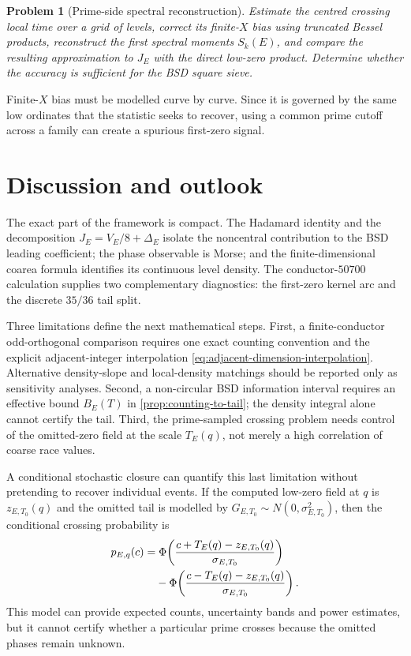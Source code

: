 \documentclass[11pt,reqno]{amsart}
\newtheorem{problem}{Problem}
\theoremstyle{remark}
\begin{document}
\begin{problem}[Prime-side spectral reconstruction]
Estimate the centred crossing local time over a grid of levels, correct its finite-$X$ bias using truncated Bessel products, reconstruct the first spectral moments $S_k(E)$, and compare the resulting approximation to $J_E$ with the direct low-zero product.  Determine whether the accuracy is sufficient for the BSD square sieve.
\end{problem}

Finite-$X$ bias must be modelled curve by curve.  Since it is governed by the same low ordinates that the statistic seeks to recover, using a common prime cutoff across a family can create a spurious first-zero signal.

\section{Discussion and outlook}
\label{sec:outlook}

The exact part of the framework is compact.  The Hadamard identity and the decomposition $J_E=V_E/8+\Delta_E$ isolate the noncentral contribution to the BSD leading coefficient; the phase observable is Morse; and the finite-dimensional coarea formula identifies its continuous level density.  The conductor-$50700$ calculation supplies two complementary diagnostics: the first-zero kernel arc and the discrete $35/36$ tail split.

Three limitations define the next mathematical steps.  First, a finite-conductor odd-orthogonal comparison requires one exact counting convention and the explicit adjacent-integer interpolation \eqref{eq:adjacent-dimension-interpolation}.  Alternative density-slope and local-density matchings should be reported only as sensitivity analyses.  Second, a non-circular BSD information interval requires an effective bound $B_E(T)$ in \cref{prop:counting-to-tail}; the density integral alone cannot certify the tail.  Third, the prime-sampled crossing problem needs control of the omitted-zero field at the scale $T_E(q)$, not merely a high correlation of coarse race values.

A conditional stochastic closure can quantify this last limitation without pretending to recover individual events.  If the computed low-zero field at $q$ is $z_{E,T_0}(q)$ and the omitted tail is modelled by $G_{E,T_0}\sim N(0,\sigma_{E,T_0}^2)$, then the conditional crossing probability is
\begin{align}
 p_{E,q}(c)=&\;\Phi\!\left(
 \frac{c+T_E(q)-z_{E,T_0}(q)}{\sigma_{E,T_0}}
 \right)\notag\\
 &-\Phi\!\left(
 \frac{c-T_E(q)-z_{E,T_0}(q)}{\sigma_{E,T_0}}
 \right).
 \label{eq:conditional-tail-closure}
\end{align}
This model can provide expected counts, uncertainty bands and power estimates, but it cannot certify whether a particular prime crosses because the omitted phases remain unknown.
\end{document}
